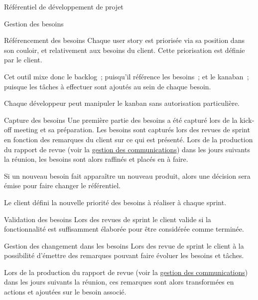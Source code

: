 \documentclass[]{article}
\begin{document}
{\begin{section}{\label{sec:Référentiel de développement de projet}Référentiel de développement de projet}
\begin{subsection}{\label{sec:Gestion des besoins}Gestion des besoins}
\begin{subsubsection}{\label{sec:Référencement des besoins}Référencement des besoins}
             Chaque user story est priorisée via sa position dans son couloir, et relativement aux besoins du client. Cette priorisation est définie par le client.

             Cet outil mixe donc le backlog ; puisqu’il référence les besoins ; et le kanaban ; puisque les tâches à effectuer sont ajoutés au sein de chaque besoin.

             Chaque développeur peut manipuler le kanban sans autorisation particulière.
         \end{subsubsection}

         \begin{subsubsection}{\label{sec:Capture des besoins}Capture des besoins}
             Une première partie des besoins a été capturé lors de la kick-off meeting et sa préparation.
             Les besoins sont capturés lors des revues de sprint en fonction des remarques du client sur ce qui est présenté. Lors de la production du rapport de revue (voir la \hyperref[sec:Gestion de la communication]{gestion des communications}) dans les jours suivants la réunion, les besoins sont alors raffinés et placés en à faire.

             Si un nouveau besoin fait apparaître un nouveau produit, alors une décision sera émise pour faire changer le référentiel.

             Le client défini la nouvelle priorité des besoins à réaliser à chaque sprint.
         \end{subsubsection}

         \begin{subsubsection}{\label{sec:Validation des besoins}Validation des besoins}
             Lors des revues de sprint le client valide si la fonctionnalité est suffisamment élaborée pour être considérée comme terminée.
         \end{subsubsection}

         \begin{subsubsection}{\label{sec:Gestion des changement dans les besoins}Gestion des changement dans les besoins}
             Lors des revue de sprint le client à la possibilité d’émettre des remarques pouvant faire évoluer les besoins et tâches.

             Lors de la production du rapport de revue (voir la \hyperref[sec:Gestion de la communication]{gestion des communications}) dans les jours suivants la réunion, ces remarques sont alors transformées en actions et ajoutées sur le besoin associé.
         \end{subsubsection}
     \end{subsection}


\end{section}}
\end{document}
